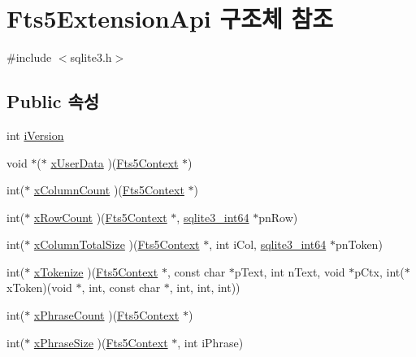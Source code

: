 \hypertarget{struct_fts5_extension_api}{}\section{Fts5\+Extension\+Api 구조체 참조}
\label{struct_fts5_extension_api}


{\ttfamily \#include $<$sqlite3.\+h$>$}

\subsection*{Public 속성}
\begin{DoxyCompactItemize}
\item 
int \hyperlink{struct_fts5_extension_api_af9c8f09c2e6f1373e6bce57ec9861682}{i\+Version}
\item 
void $\ast$($\ast$ \hyperlink{struct_fts5_extension_api_a8e651288d8e0cf25f20f2b838f47ac34}{x\+User\+Data} )(\hyperlink{sqlite3_8h_a97821b95ebebd43db901977ffd5b26bc}{Fts5\+Context} $\ast$)
\item 
int($\ast$ \hyperlink{struct_fts5_extension_api_a427409c50da4e179c8f2d36b22a4ba21}{x\+Column\+Count} )(\hyperlink{sqlite3_8h_a97821b95ebebd43db901977ffd5b26bc}{Fts5\+Context} $\ast$)
\item 
int($\ast$ \hyperlink{struct_fts5_extension_api_ae1eb7ad1d3c131a09376134ecc099568}{x\+Row\+Count} )(\hyperlink{sqlite3_8h_a97821b95ebebd43db901977ffd5b26bc}{Fts5\+Context} $\ast$, \hyperlink{sqlite3_8h_a0a4d3e6c1ad46f90e746b920ab6ca0d2}{sqlite3\+\_\+int64} $\ast$pn\+Row)
\item 
int($\ast$ \hyperlink{struct_fts5_extension_api_a096e79406ae03df9796a2082d0ac8269}{x\+Column\+Total\+Size} )(\hyperlink{sqlite3_8h_a97821b95ebebd43db901977ffd5b26bc}{Fts5\+Context} $\ast$, int i\+Col, \hyperlink{sqlite3_8h_a0a4d3e6c1ad46f90e746b920ab6ca0d2}{sqlite3\+\_\+int64} $\ast$pn\+Token)
\item 
int($\ast$ \hyperlink{struct_fts5_extension_api_a670af0d7715f69834376f8df187dcf30}{x\+Tokenize} )(\hyperlink{sqlite3_8h_a97821b95ebebd43db901977ffd5b26bc}{Fts5\+Context} $\ast$, const char $\ast$p\+Text, int n\+Text, void $\ast$p\+Ctx, int($\ast$x\+Token)(void $\ast$, int, const char $\ast$, int, int, int))
\item 
int($\ast$ \hyperlink{struct_fts5_extension_api_a3ba0207080a9ca498625eefcc120bf1e}{x\+Phrase\+Count} )(\hyperlink{sqlite3_8h_a97821b95ebebd43db901977ffd5b26bc}{Fts5\+Context} $\ast$)
\item 
int($\ast$ \hyperlink{struct_fts5_extension_api_aeda6faa66f47f9116c9ceba882aaedd2}{x\+Phrase\+Size} )(\hyperlink{sqlite3_8h_a97821b95ebebd43db901977ffd5b26bc}{Fts5\+Context} $\ast$, int i\+Phrase)

\end{DoxyCompactItemize}
